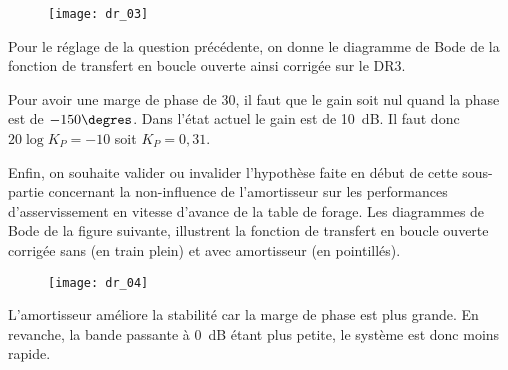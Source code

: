 \else
\fi


\ifprof
\else
\begin{figure}[!h]
\texttt{[image: dr\_03]}
\end{figure}

 
Pour le réglage de la question précédente, on donne le diagramme de Bode de la fonction de 
transfert en boucle ouverte ainsi corrigée sur le DR3. 
\fi

\ifprof
\begin{corrige}
Pour avoir une marge de phase de 30\degres, il faut que le gain soit nul quand la phase est de $-150\degres$. Dans l'état actuel le gain est de \SI{10}{dB}. Il faut donc $20\log K_P = -10$ soit $K_P = 0,31$.
\end{corrige}
\else
\fi
 
 
\ifprof
\else
Enfin, on souhaite valider ou invalider l’hypothèse faite en début de cette sous-partie concernant la 
non-influence de l’amortisseur sur les performances d’asservissement en vitesse d’avance de la 
table de forage. Les diagrammes de Bode de la figure suivante, 
illustrent la fonction de transfert en boucle ouverte corrigée sans (en train plein) et avec amortisseur 
(en pointillés). 
 
 
\begin{figure}[!h]
\texttt{[image: dr\_04]}
\end{figure}

 \fi
 
\ifprof
\begin{corrige}
L'amortisseur améliore la stabilité car la marge de phase est plus grande. En revanche, la bande passante à \SI{0}{dB} étant plus petite, le système est donc moins rapide.
\end{corrige}
\else
\fi




